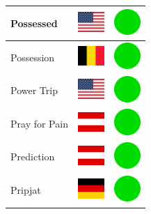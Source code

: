 \documentclass[12pt, a4paper, twoside]{report}
\begin{document}
\begin{center}
\begin{longtable}{|p{5cm}|p{2cm}|p{2cm}|}
 Possessed                                                  & \includegraphics[width=1cm]{../img/flags/us} &   \includegraphics[width=1cm]{../likes/y} \\ \hline
 Possession                                                 & \includegraphics[width=1cm]{../img/flags/be} &   \includegraphics[width=1cm]{../likes/y} \\ \hline
 Power Trip                                                 & \includegraphics[width=1cm]{../img/flags/us} &   \includegraphics[width=1cm]{../likes/y} \\ \hline
 Pray for Pain                                              & \includegraphics[width=1cm]{../img/flags/at} &   \includegraphics[width=1cm]{../likes/y} \\ \hline
 Prediction                                                 & \includegraphics[width=1cm]{../img/flags/at} &   \includegraphics[width=1cm]{../likes/y} \\ \hline
 Pripjat                                                    & \includegraphics[width=1cm]{../img/flags/de} &   \includegraphics[width=1cm]{../likes/y} \\ \hline

\end{longtable}
\end{center}
\end{document}
